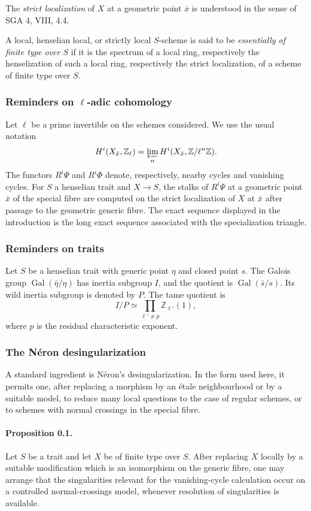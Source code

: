 \documentclass[11pt]{article}
\theoremstyle{plain}
\theoremstyle{definition}
\theoremstyle{remark}
\newcommand{\ZZ}{\mathbb Z}
\DeclareMathOperator{\Gal}{Gal}
\begin{document}
The \emph{strict localization} of $X$ at a geometric point $\bar x$ is understood in the sense of SGA 4, VIII, 4.4.

A local, henselian local, or strictly local $S$-scheme is said to be \emph{essentially of finite type over $S$} if it is the spectrum of a local ring, respectively the henselization of such a local ring, respectively the strict localization, of a scheme of finite type over $S$.

\subsubsection*{Reminders on $\ell$-adic cohomology}

Let $\ell$ be a prime invertible on the schemes considered. We use the usual notation
\[
H^i(X_{\bar x},\ZZ_\ell)=\varprojlim_n H^i(X_{\bar x},\ZZ/\ell^n\ZZ).
\]
The functors $R^i\Psi$ and $R^i\Phi$ denote, respectively, nearby cycles and vanishing cycles. For $S$ a henselian trait and $X\to S$, the stalks of $R^i\Psi$ at a geometric point $\bar x$ of the special fibre are computed on the strict localization of $X$ at $\bar x$ after passage to the geometric generic fibre. The exact sequence displayed in the introduction is the long exact sequence associated with the specialization triangle.

\subsubsection*{Reminders on traits}

Let $S$ be a henselian trait with generic point $\eta$ and closed point $s$. The Galois group $\Gal(\bar\eta/\eta)$ has inertia subgroup $I$, and the quotient is $\Gal(\bar s/s)$. Its wild inertia subgroup is denoted by $P$. The tame quotient is
\[
I/P\simeq \prod_{\ell'\neq p}\ZZ_{\ell'}(1),
\]
where $p$ is the residual characteristic exponent.

\subsubsection*{The Néron desingularization}

A standard ingredient is Néron's desingularization. In the form used here, it permits one, after replacing a morphism by an étale neighbourhood or by a suitable model, to reduce many local questions to the case of regular schemes, or to schemes with normal crossings in the special fibre.

\paragraph{Proposition 0.1.}
Let $S$ be a trait and let $X$ be of finite type over $S$. After replacing $X$ locally by a suitable modification which is an isomorphism on the generic fibre, one may arrange that the singularities relevant for the vanishing-cycle calculation occur on a controlled normal-crossings model, whenever resolution of singularities is available.
\end{document}
